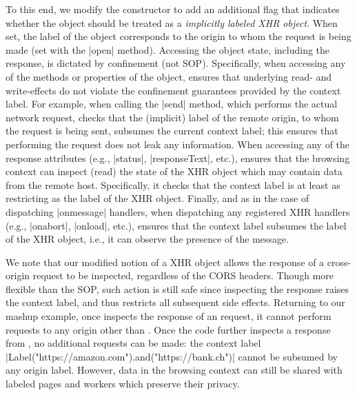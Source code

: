 To this end, we modify the \xhr{} constructor to add an additional
flag that indicates whether the object should be treated as a
\emph{implicitly labeled XHR object}.
%
When set, the  label of the object corresponds to the origin
to whom the request is being made (set with the \js|open| method). 
Accessing the object state, including the response, is dictated by
confinement (not SOP).
%
Specifically, when accessing any of the methods or properties of
the object, \sys{} ensures that underlying read- and write-effects do
not violate the confinement guarantees provided by the context label.
%
For example, when calling the \js|send| method, which performs the
actual network request, \sys{} checks that the (implicit) label of the
remote origin, to whom the request is being sent, subsumes the current
context label;
%
this ensures that performing the request does not leak any
information.
%
When accessing any of the response attributes (e.g., \js|status|,
\js|responseText|, etc.), \sys{} ensures that the browsing context can inspect
(read) the state of the XHR object which may contain data from the remote host.
%
Specifically, it checks that the context label is at least as
restricting as the label of the XHR object.
%
Finally, and as in the case of dispatching \js|onmessage| handlers,
when dispatching any registered XHR
handlers (e.g., \js|onabort|, \js|onload|, etc.), \sys{} ensures that the
context label subsumes the label of the XHR object, i.e., it can observe 
the presence of the message.
 
We note that our modified notion of a XHR object allows the response of a
cross-origin request to be inspected, regardless of the CORS headers.
%
Though more flexible than the SOP, such action is still safe since inspecting
the response raises the context label, and thus restricts all subsequent side
effects.
%
Returning to our mashup example, once  inspects the
response of an  request, it cannot perform requests
to any origin other than .
%
Once the code further inspects a response from , no
additional requests can be made: the context label  
\js|Label("https://amazon.com").and("https://bank.ch")|
cannot be subsumed by any origin label. 
%
However, data in the browsing context can still be shared with labeled
pages and workers which preserve their privacy.
% 

